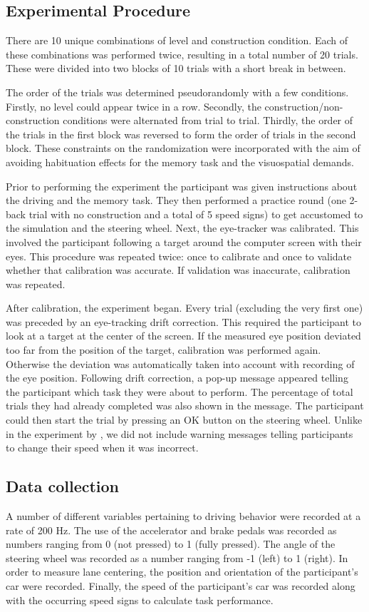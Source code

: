 \subsection{Experimental Procedure}
There are 10 unique combinations of \nback level and construction condition.
Each of these combinations was performed twice, resulting in a total number of 20 trials.
These were divided into two blocks of 10 trials with a short break in between.

The order of the trials was determined pseudorandomly with a few conditions. 
Firstly, no \nback level could appear twice in a row. 
Secondly, the construction/non-construction conditions were alternated from trial to trial. 
Thirdly, the order of the trials in the first block was reversed to form the order of trials in the second block.
These constraints on the randomization were incorporated with the aim of avoiding habituation effects for the memory task and the visuospatial demands.

Prior to performing the experiment the participant was given instructions about the driving and the memory task. 
They then performed a practice round (one 2-back trial with no construction and a total of 5 speed signs) to get accustomed to the simulation and the steering wheel. 
Next, the eye-tracker was calibrated. 
This involved the participant following a target around the computer screen with their eyes. 
This procedure was repeated twice: once to calibrate and once to validate whether that calibration was accurate. 
If validation was inaccurate, calibration was repeated.

After calibration, the experiment began. 
Every trial (excluding the very first one) was preceded by an eye-tracking drift correction. 
This required the participant to look at a target at the center of the screen. 
If the measured eye position deviated too far from the position of the target, calibration was performed again. 
Otherwise the deviation was automatically taken into account with recording of the eye position.
Following drift correction, a pop-up message appeared telling the participant which \nback task they were about to perform.
The percentage of total trials they had already completed was also shown in the message. 
The participant could then start the trial by pressing an OK button on the steering wheel.
Unlike in the experiment by \citeauthor{Scheunemann2019}, we did not include warning messages telling participants to change their speed when it was incorrect.

\subsection{Data collection}
A number of different variables pertaining to driving behavior were recorded at a rate of 200 Hz. 
The use of the accelerator and brake pedals was recorded as numbers ranging from 0 (not pressed) to 1 (fully pressed). 
The angle of the steering wheel was recorded as a number ranging from -1 (left) to 1 (right).
In order to measure lane centering, the position and orientation of the participant's car were recorded. 
Finally, the speed of the participant's car was recorded along with the occurring speed signs to calculate \nback task performance. 


